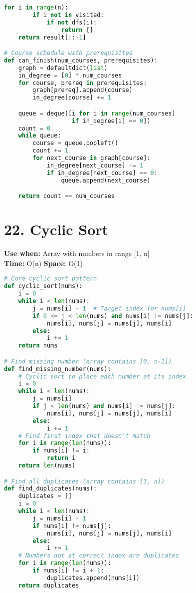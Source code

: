 \documentclass[8pt,landscape]{article}
\begin{document}
\begin{multicols}{3}
\begin{lstlisting}[language=Python]
    for i in range(n):
        if i not in visited:
            if not dfs(i):
                return []
    return result[::-1]

# Course schedule with prerequisites
def can_finish(num_courses, prerequisites):
    graph = defaultdict(list)
    in_degree = [0] * num_courses
    for course, prereq in prerequisites:
        graph[prereq].append(course)
        in_degree[course] += 1

    queue = deque([i for i in range(num_courses)
                   if in_degree[i] == 0])
    count = 0
    while queue:
        course = queue.popleft()
        count += 1
        for next_course in graph[course]:
            in_degree[next_course] -= 1
            if in_degree[next_course] == 0:
                queue.append(next_course)

    return count == num_courses
\end{lstlisting}

\section*{22. Cyclic Sort}
\textbf{Use when:} Array with numbers in range [1, n] \\
\textbf{Time:} O(n) \quad \textbf{Space:} O(1)
\begin{lstlisting}[language=Python]
# Core cyclic sort pattern
def cyclic_sort(nums):
    i = 0
    while i < len(nums):
        j = nums[i] - 1  # Target index for nums[i]
        if 0 <= j < len(nums) and nums[i] != nums[j]:
            nums[i], nums[j] = nums[j], nums[i]
        else:
            i += 1
    return nums

# Find missing number (array contains [0, n-1])
def find_missing_number(nums):
    # Cyclic sort to place each number at its index
    i = 0
    while i < len(nums):
        j = nums[i]
        if j < len(nums) and nums[i] != nums[j]:
            nums[i], nums[j] = nums[j], nums[i]
        else:
            i += 1
    # Find first index that doesn't match
    for i in range(len(nums)):
        if nums[i] != i:
            return i
    return len(nums)

# Find all duplicates (array contains [1, n])
def find_duplicates(nums):
    duplicates = []
    i = 0
    while i < len(nums):
        j = nums[i] - 1
        if nums[i] != nums[j]:
            nums[i], nums[j] = nums[j], nums[i]
        else:
            i += 1
    # Numbers not at correct index are duplicates
    for i in range(len(nums)):
        if nums[i] != i + 1:
            duplicates.append(nums[i])
    return duplicates
\end{lstlisting}


\end{multicols}
\end{document}
